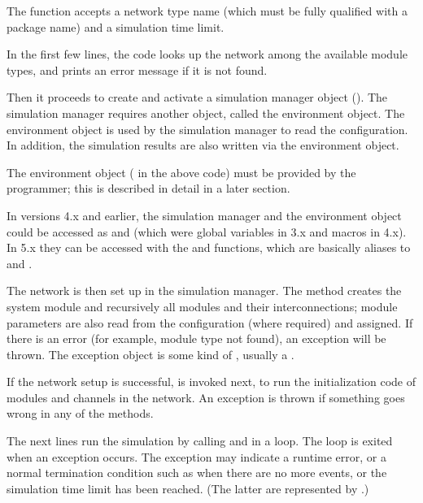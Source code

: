 The function accepts a network type name (which must be fully qualified
with a package name) and a simulation time limit.

In the first few lines, the code looks up the network among the available
module types, and prints an error message if it is not found.

Then it proceeds to create and activate a simulation manager object
(). The simulation manager requires another object,
called the environment object. The environment object is used by the
simulation manager to read the configuration. In addition, the simulation
results are also written via the environment object.

The environment object ( in the above code) must
be provided by the programmer; this is described in detail in a later section.

\begin{note}
In versions 4.x and earlier, the simulation manager and the
environment object could be accessed as  and 
(which were global variables in 3.x and macros in 4.x). In 5.x they can be
accessed with the  and  functions,
which are basically aliases to  and
.
\end{note}

The network is then set up in the simulation manager. The
 method creates the system module and
recursively all modules and their interconnections; module parameters are
also read from the configuration (where required) and assigned. If there is
an error (for example, module type not found), an exception will be thrown. The
exception object is some kind of , usually a
.

If the network setup is successful,  is
invoked next, to run the initialization code of modules and channels in the
network. An exception is thrown if something goes wrong in any of the
 methods.

The next lines run the simulation by calling
 and 
in a loop. The loop is exited when an exception occurs. The exception
may indicate a runtime error, or a normal termination condition such as
when there are no more events, or the simulation time limit has been
reached. (The latter are represented by .)

